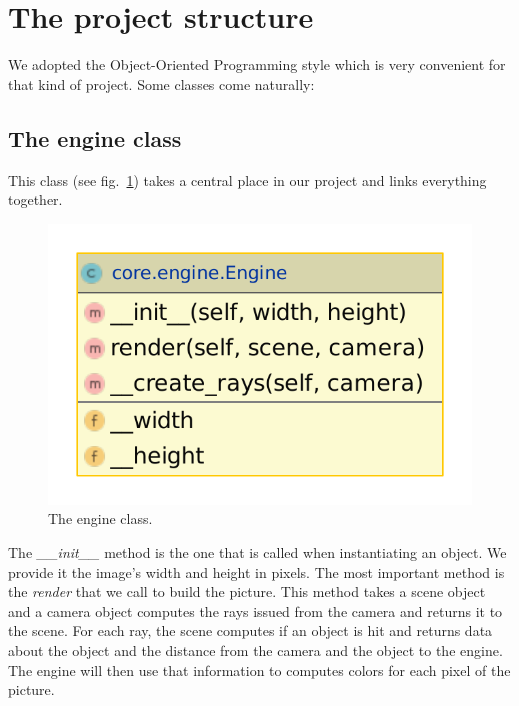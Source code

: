 \documentclass[acmsmall]{acmart}
\begin{document}
\section{The project structure}
We adopted the Object-Oriented Programming style which is very convenient for that kind of project. Some classes come naturally:
\subsection*{The engine class}
This class (see fig.~\ref{fig:engine}) takes a central place in our project and links everything together.
\begin{figure}[h]
    \centering
    \includegraphics[scale=0.3]{img/engine.pdf}
    \caption{The engine class.}
    \label{fig:engine}
\end{figure}

The \emph{\_\_init\_\_} method is the one that is called when instantiating an object. We provide it the image's width and height in pixels.
The most important method is the \emph{render} that we call to build the picture. This method takes a scene object and a camera object computes the rays issued from the camera and returns it to the scene. For each ray, the scene computes if an object is hit and returns data about the object and the distance from the camera and the object to the engine.
The engine will then use that information to computes colors for each pixel of the picture.
\end{document}
